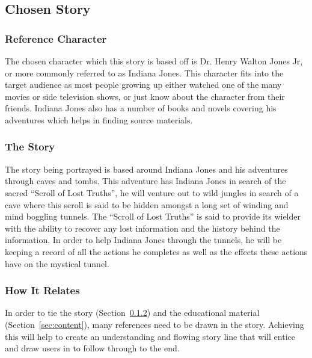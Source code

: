 \subsection{Chosen Story}
\subsubsection{Reference Character}
The chosen character which this story is based off is Dr. Henry Walton Jones Jr, or more commonly referred to as Indiana Jones. This character fits into the target audience as most people growing up either watched one of the many movies or side television shows, or just know about the character from their friends. Indiana Jones also has a number of books and novels covering his adventures which helps in finding source materials.

\subsubsection{The Story}\label{sec:TheStory}
The story being portrayed is based around Indiana Jones and his adventures through caves and tombs. This adventure has Indiana Jones in search of the sacred ``Scroll of Lost Truths'', he will venture out to wild jungles in search of a cave where this scroll is said to be hidden amongst a long set of winding and mind boggling tunnels. The ``Scroll of Lost Truths'' is said to provide its wielder with the ability to recover any lost information and the history behind the information. In order to help Indiana Jones through the tunnels, he will be keeping a record of all the actions he completes as well as the effects these actions have on the mystical tunnel.

\subsubsection{How It Relates}
In order to tie the story (Section~\ref{sec:TheStory}) and the educational material (Section~\ref{sec:content}), many references need to be drawn in the story. Achieving this will help to create an understanding and flowing story line that will entice and draw users in to follow through to the end.\\\\

